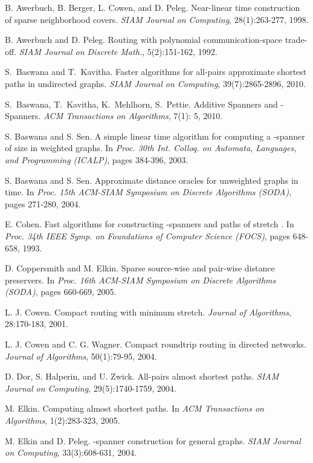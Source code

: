 \documentclass[a4paper,11pt]{article}
\theoremstyle{definition}
\begin{document}
\begin{thebibliography}{20}


B. Awerbuch, B. Berger, L. Cowen, and D. Peleg.
Near-linear time construction of sparse neighborhood covers.
{\em SIAM Journal on Computing}, 28(1):263-277, 1998.

B. Awerbuch and D. Peleg.
Routing with polynomial communication-space trade-off.
{\em SIAM Journal on Discrete Math.}, 5(2):151-162, 1992.

S.~Baswana and T.~Kavitha.
Faster algorithms for all-pairs approximate shortest paths in undirected graphs.
{\em SIAM Journal on Computing}, 39(7):2865-2896, 2010.

S.~Baswana, T.~Kavitha, K.~Mehlhorn, S.~Pettie.
Additive Spanners and -Spanners.
{\em ACM Transactions on Algorithms}, 7(1): 5, 2010.

S. Baswana and S. Sen.
A simple linear time algorithm for computing a -spanner of  size in weighted graphs.
In {\em Proc. 30th Int. Colloq. on Automata, Languages, and Programming (ICALP)}, pages 384-396, 2003.

S. Baswana and S. Sen.
Approximate distance oracles for unweighted graphs in  time.
In {\em Proc. 15th ACM-SIAM Symposium on Discrete Algorithms (SODA)}, pages 271-280, 2004.


E. Cohen.
Fast algorithms for constructing -spanners and paths of stretch .
In {\em Proc. 34th IEEE Symp. on Foundations of Computer Science (FOCS)},  pages 648-658, 1993.

D. Coppersmith and M. Elkin.
Sparse source-wise and pair-wise distance preservers.
In {\em Proc. 16th ACM-SIAM Symposium on Discrete Algorithms (SODA)}, pages 660-669, 2005.

L. J. Cowen.
Compact routing with minimum stretch.
{\em Journal of Algorithms}, 28:170-183, 2001.

L. J. Cowen and C. G. Wagner.
Compact roundtrip routing in directed networks.
{\em Journal of Algorithms}, 50(1):79-95, 2004.

D. Dor, S. Halperin, and U. Zwick.
All-pairs almost shortest paths.
{\em SIAM Journal on Computing}, 29(5):1740-1759, 2004.

M. Elkin.
Computing almost shortest paths.
In {\em ACM Transactions on Algorithms}, 1(2):283-323, 2005.

M. Elkin and D. Peleg.
-spanner construction for general  graphs.
{\em SIAM Journal on Computing}, 33(3):608-631, 2004.


\end{thebibliography}
\end{document}

